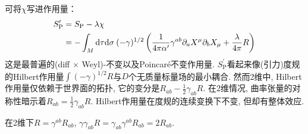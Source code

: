 可将$\chi$写进作用量：
\begin{equation}
\begin{aligned}
S_{\mathrm{P}}^{\prime} &=S_{\mathrm{P}}-\lambda \chi \\
&=-\int_{M} \mathrm{d} \tau \mathrm{d} \sigma\:(-\gamma)^{1 / 2}\left(\frac{1}{4 \pi \alpha^{\prime}} \gamma^{a b} \partial_{a} X^{\mu} \partial_{b} X_{\mu}+\frac{\lambda}{4 \pi} R\right)
\end{aligned}
\end{equation}
这是最普遍的(diff $\times$ Weyl)-不变以及Poincar\'{e}不变作用量. $S_{\mathrm{P}}^\prime$看起来像(引力)度规的Hilbert作用量$\int (-\gamma)^{1/2}R$与$D$个无质量标量场的最小耦合. 然而2维中, Hilbert作用量仅依赖于世界面的拓扑, 它的变分是$R_{ab}-\frac{1}{2}\gamma_{ab}R$. 在2维情况, 曲率张量的对称性暗示着$R_{ab}=\frac{1}{2}\gamma_{ab}R$. Hilbert作用量在度规的连续变换下不变, 但却有整体效应. \\
\begin{remark}
    在2维下$R=\gamma^{ab}R_{ab}$, $\gamma\gamma_{ab} R=\gamma_{ab}\gamma^{ab}R_{ab}=2R_{ab}$.
\end{remark}

